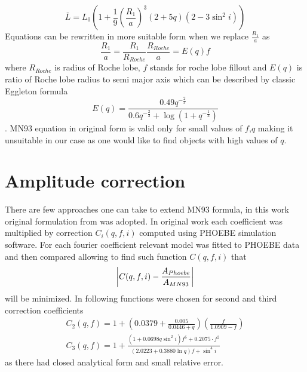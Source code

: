 \documentclass{pracalicmgr}
\begin{document}
\begin{equation}
    \overline{L}=L_0\left(1+\frac{1}{9}\left(\frac{R_1}{a}\right)^3(2+5q)(2-3\sin^2{i})\right)
\end{equation}
Equations can be rewritten in more suitable form when we replace $\frac{R_1}{a}$ as
$$\frac{R_1}{a}=\frac{R_1}{R_{Roche}}\frac{R_{Roche}}{a}=E(q)f$$ 
where $R_{Roche}$ 
is radius of Roche lobe, $f$ stands for roche lobe fillout and $E(q)$ is ratio of Roche lobe radius to semi major axis which can be described by classic Eggleton formula 
\citep{eggleton_approximations_1983}
\begin{equation}
    E(q)=\frac{0.49q^{-\frac{2}{3}}}{0.6q^{-\frac{2}{3}}+\log{(1+q^{-\frac{1}{3}})}}
\end{equation}. 
MN93 equation in original form is valid only for small values of $f$,$q$ making it unsuitable in our case as one would like to find objects with high values of $q$.
\section{Amplitude correction}
There are few approaches one can take to extend MN93 formula, in this work original formulation from \citep{gomel_search_2021} was adopted.
In original work each coefficient was multiplied by correction $C_i(q,f,i)$ computed using PHOEBE simulation software. For each
fourier coefficient relevant model was fitted to PHOEBE data and then compared allowing to find such function $C(q,f,i)$ that 
\begin{equation}
    \abs{C(q,f,i)-\frac{A_{Phoebe}}{A_{MN93}}}
\end{equation}
will be minimized. In \cite{gomel_search_2021} following functions were chosen for second and third correction coefficients
\begin{align}
    C_2(q,f)=1+\left(0.0379+\frac{0.005}{0.0446+q}\right)\left(\frac{f}{1.0909-f}\right)\\
    C_3(q,f)=1+\frac{(1+0.0698q\sin^2{i})f^6+0.2075\cdot f^2}{(2.0223+0.3880\ln{q})f+\sin^4{i}}
\end{align}
as there had closed analytical form and small relative error. 
\end{document}
